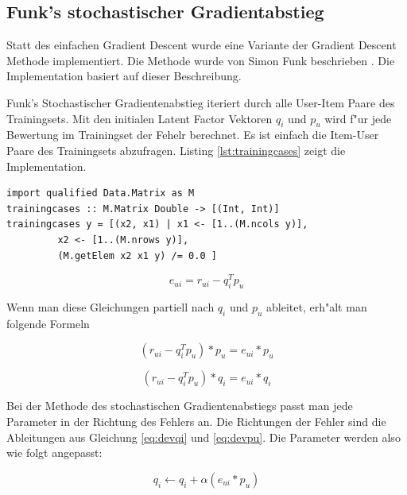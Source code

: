 \documentclass[a4paper, 12pt]{article}
\begin{document}
\subsection{Funk's stochastischer Gradientabstieg}
\label{sec:funksvd}

Statt des einfachen Gradient Descent wurde eine Variante der Gradient Descent Methode implementiert. Die Methode wurde von Simon Funk beschrieben \cite{funk}. Die Implementation basiert auf dieser Beschreibung.

Funk's Stochastischer Gradientenabstieg iteriert durch alle User-Item Paare des Trainingsets. Mit den initialen Latent Factor Vektoren $q_i$ und $p_u$ wird f"ur jede Bewertung im Trainingset der Fehelr berechnet. Es ist einfach die Item-User Paare des Trainingsets abzufragen. Listing \ref{lst:trainingcases} zeigt die Implementation.

\begin{lstlisting}[caption=Abfrage des Trainingsets,label=lst:trainingcases]
import qualified Data.Matrix as M  
trainingcases :: M.Matrix Double -> [(Int, Int)]
trainingcases y = [(x2, x1) | x1 <- [1..(M.ncols y)], 
         x2 <- [1..(M.nrows y)],
         (M.getElem x2 x1 y) /= 0.0 ]
\end{lstlisting}

\begin{equation}
  \label{eq:error1}
  e_{ui} = r_{ui} - q_i^T p_u
\end{equation}

Wenn man diese Gleichungen partiell nach $q_i$ und $p_u$ ableitet, erh"alt man folgende Formeln

\begin{equation}
  \label{eq:devqi}
  (r_{ui} - q_i^T p_u) * p_u =  e_{ui} * p_u
\end{equation}

\begin{equation}
  \label{eq:devpu}
    (r_{ui} - q_i^T p_u) * q_i =  e_{ui} * q_i
\end{equation}

Bei der Methode des stochastischen Gradientenabstiegs passt man jede Parameter in der Richtung des Fehlers an. Die Richtungen der Fehler sind die Ableitungen aus Gleichung \ref{eq:devqi} und \ref{eq:devpu}. Die Parameter werden also wie folgt angepasst:

\begin{equation}
  \label{eq:assignpi}
 q_i \leftarrow q_i + \alpha (e_{ui} * p_u)
\end{equation}
\end{document}
